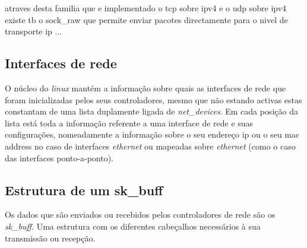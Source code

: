 atraves desta familia que e implementado o tcp sobre ipv4 e o udp sobre ipv4 existe tb o sock\_raw que permite enviar pacotes directamente para o nivel de transporte ip ... 

% 
%						
%
% 

\subsection{Interfaces de rede}

O núcleo do \textit{linux} mantém a informação sobre quais as interfaces de rede que foram inicializadas pelos seus controladores, mesmo que não estando activas estas constantam de uma lista duplamente ligada de \textit{net\_devices}. 
 Em cada posição da lista está toda a informação referente a uma interface de rede e suas configurações, nomeadamente a informação sobre o seu endereço ip ou o seu mac address no caso de interfaces \textit{ethernet} ou mapeadas sobre \textit{ethernet} (como o caso das interfaces ponto-a-ponto).
 
\subsection{Estrutura de um sk\_buff}
 Os dados que são enviados ou recebidos pelos controladores de rede são os \textit{sk\_buff}. Uma estrutura com os diferentes cabeçalhos necessários à sua transmissão ou recepção.
\lstset{language=C}
\begin{lstlisting}

\end{lstlisting}

